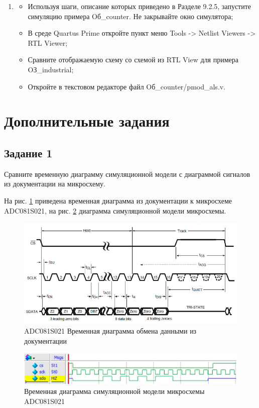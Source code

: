 \documentclass[a4paper,14pt]{article}
\begin{document}
\begin{enumerate}
		
		\item 
		\begin{itemize}
			\item Используя шаги, описание которых приведено в Разделе 9.2.5, запустите симуляцию примера Oб\_counter. Не закрывайте окно симулятора;
			\item В среде Quartus Prime откройте пункт меню Tools -> Netlist Viewers -> RTL Viewer;
			\item Сравните отображаемую схему со схемой из RТL View для примера OЗ\_industrial;
			\item Откройте в текстовом редакторе файл Oб\_counter/pmod\_als.v.
		\end{itemize}
	\end{enumerate}
	
	\section{Дополнительные задания}
	
	\subsection{Задание 1}
	
	Сравните временную диаграмму симуляционной модели с	диаграммой сигналов из документации на микросхему. 		
	
	На рис. \ref{fig:9.7} приведена временная диаграмма из документации к микросхеме ADC081S021, на рис. \ref{fig:9.11} диаграмма симуляционной модели микросхемы.
	
	\begin{figure}[H]
		\centering
		\includegraphics[width=0.9\linewidth]{images/9_7}
		\caption{ADC081S021 Временная диаграмма обмена данными из документации}
		\label{fig:9.7}
	\end{figure}
	
	
	\begin{figure}[H]
		\centering
		\includegraphics[width=0.9\linewidth]{images/9_11}
		\caption{Временная диаграмма симуляционной модели микросхемы ADC081S021}
		\label{fig:9.11}
	\end{figure}
\end{document}
